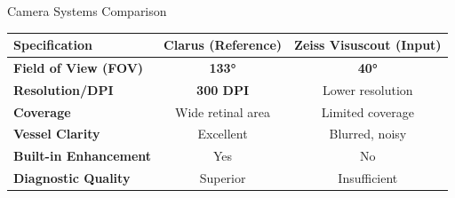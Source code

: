 \documentclass[aspectratio=169]{beamer}
\begin{document}
\begin{frame}{Camera Systems Comparison}
\begin{table}
\centering
\renewcommand{\arraystretch}{1.5}
\begin{tabular}{|l|c|c|}
\hline
\textbf{Specification} & \textbf{\textcolor{green!50!black}{Clarus (Reference)}} & \textbf{\textcolor{red!70!black}{Zeiss Visuscout (Input)}} \\
\hline\hline
\textbf{Field of View (FOV)} & \textcolor{green!50!black}{\huge \textbf{133°}} & \textcolor{red!70!black}{\huge \textbf{40°}} \\
\hline
\textbf{Resolution/DPI} & \textcolor{green!50!black}{\textbf{300 DPI}} & Lower resolution \\
\hline
\textbf{Coverage} & Wide retinal area & \textcolor{red!70!black}{Limited coverage} \\
\hline
\textbf{Vessel Clarity} & Excellent & \textcolor{red!70!black}{Blurred, noisy} \\
\hline
\textbf{Built-in Enhancement} & Yes & No \\
\hline
\textbf{Diagnostic Quality} & \textcolor{green!50!black}{Superior} & \textcolor{red!70!black}{Insufficient} \\
\hline
\end{tabular}
\end{table}

\vspace{0.3cm}
\centering
{}
\end{frame}
\end{document}
